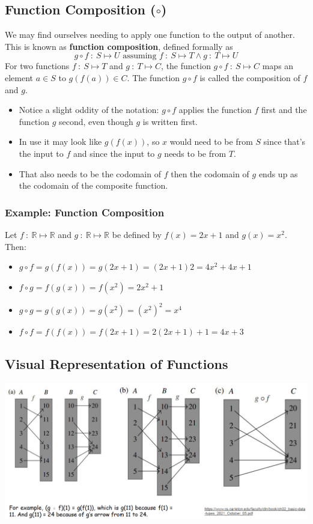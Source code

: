 \documentclass[10pt]{article}
\begin{document}
\subsection*{Function Composition ($\circ$)}
We may find ourselves needing to apply one function to the output of another.  This is known as \textbf{function composition}, defined formally as
\[g \circ f \::\: S \mapsto U \text{ assuming } f \::\: S \mapsto T \land g\::\: T \mapsto U\]
For two functions $f \::\: S \mapsto T$ and $g \::\: T \mapsto C$, the function $g \circ f \::\: S \mapsto C$ maps an element $a \in S$ to $g(f(a)) \in C$.  The function $g \circ f$ is called the composition of $f$ and $g$.
\begin{itemize}
	\item Notice a slight oddity of the notation: $g \circ f$ applies the function $f$ first and the function $g$ second, even though $g$ is written first.
	\item In use it may look like $g(f(x))$, so $x$ would need to be from $S$ since that's the input to $f$ and since the input to $g$ needs to be from $T$.
	\item That also needs to be the codomain of $f$ then the codomain of $g$ ends up as the codomain of the composite function.
\end{itemize}

\subsubsection*{Example: Function Composition}
Let $f \::\: \mathbb{R} \mapsto \mathbb{R}$ and $g \::\: \mathbb{R} \mapsto \mathbb{R}$ be defined by $f(x) = 2x + 1$ and $g(x) = x^2$.  Then:
\begin{itemize}
	\item $g \circ f = g(f(x)) = g(2x + 1) = (2x + 1)2 = 4x^2 + 4x + 1$
	\item $f \circ g = f(g(x)) = f(x^2) = 2x^2 + 1$
	\item $g \circ g = g(g(x)) = g(x^2) = \left(x^2\right)^2 = x^4$
	\item $f \circ f = f(f(x)) = f(2x + 1) = 2(2x + 1) + 1 = 4x + 3$
\end{itemize}

\subsection*{Visual Representation of Functions}
\begin{center} 
	\includegraphics*[width=\textwidth]{M2_6.png} 
\end{center}
\end{document}
